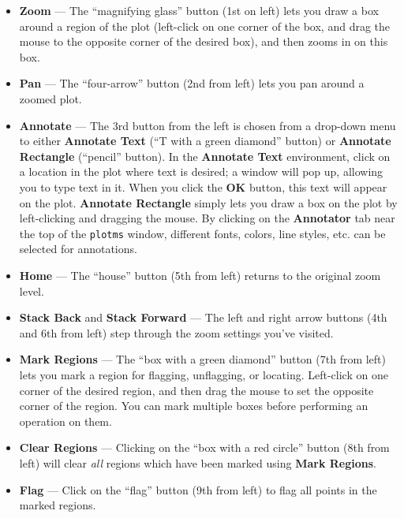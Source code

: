 \begin{itemize}

\item {\bf Zoom} --- The ``magnifying glass'' button (1st on left) lets you draw a box around a region of the plot (left-click on one corner of the box, and drag the mouse to the opposite corner of the desired box), and then zooms in on this box.  

\item {\bf Pan} --- The ``four-arrow'' button (2nd from left) lets you pan around a zoomed plot.

\item {\bf Annotate} --- The 3rd button from the left is chosen from a
  drop-down menu to either {\bf Annotate Text} (``T with a green
  diamond'' button) or {\bf Annotate Rectangle} (``pencil''
  button). In the {\bf Annotate Text} environment, click on a location
  in the plot where text is desired; a window will pop up, allowing
  you to type text in it. When you click the {\bf OK} button, this
  text will appear on the plot. {\bf Annotate Rectangle} simply lets
  you draw a box on the plot by left-clicking and dragging the
  mouse. By clicking on the {\bf Annotator} tab near the top of the
  {\tt plotms} window, different fonts, colors, line styles, etc. can
  be selected for annotations.

\item {\bf Home} --- The ``house'' button (5th from left) returns to the original zoom level.

\item {\bf Stack Back} and {\bf Stack Forward} --- The left and right
  arrow buttons (4th and 6th from left) step through the zoom settings
  you've visited.

\item {\bf Mark Regions} --- The ``box with a green diamond'' button
  (7th from left) lets you mark a region for flagging, unflagging, or
  locating. Left-click on one corner of the desired region, and then
  drag the mouse to set the opposite corner of the region. You can
  mark multiple boxes before performing an operation on them.

\item {\bf Clear Regions} --- Clicking on the ``box with a red
  circle'' button (8th from left) will clear {\it all} regions which
  have been marked using {\bf Mark Regions}.

\item {\bf Flag} --- Click on the ``flag'' button (9th from left) to flag all points in the marked regions.


\end{itemize}
